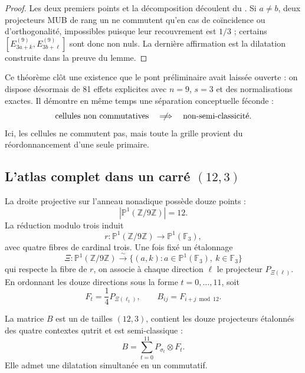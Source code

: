 \begin{proof}
Les deux premiers points et la décomposition découlent du
. Si $a\ne b$, deux projecteurs MUB de rang un ne
commutent qu'en cas de coïncidence ou d'orthogonalité, impossibles puisque leur recouvrement
est $1/3$ ; certains
$[E_{3a+k}^{(9)},E_{3b+\ell}^{(9)}]$ sont donc non nuls. La dernière affirmation est la
dilatation construite dans la preuve du lemme.
\end{proof}

\begin{bridgebox}
Ce théorème clôt une existence que le pont préliminaire avait laissée
ouverte : on dispose désormais de 81 effets explicites avec $n=9$, $s=3$ et des normalisations
exactes. Il démontre en même temps une séparation conceptuelle féconde :
\[
 \text{cellules non commutatives}
 \quad\centernot\Longrightarrow\quad
 \text{non-semi-classicité}.
\]
Ici, les cellules ne commutent pas, mais toute la grille provient du réordonnancement d'une
seule \POVM primaire.
\end{bridgebox}

\subsection{L'atlas complet dans un carré \texorpdfstring{$(12,3)$}{(12,3)}}

La droite projective sur l'anneau nonadique possède douze points :
\[
 |\mathbb P^1(\mathbb Z/9\mathbb Z)|=12.
 \tag{GMC-4.9}
\]
La réduction modulo trois induit
\[
 r:\mathbb P^1(\mathbb Z/9\mathbb Z)
 \longrightarrow\mathbb P^1(\mathbb F_3),
 \tag{GMC-4.10}
\]
avec quatre fibres de cardinal trois. Une fois fixé un étalonnage
\[
 \Xi:\mathbb P^1(\mathbb Z/9\mathbb Z)
 \xrightarrow{\sim}
 \{(a,k):a\in\mathbb P^1(\mathbb F_3),\ k\in\mathbb F_3\}
 \tag{GMC-4.11}
\]
qui respecte la fibre de $r$, on associe à chaque direction $\ell$ le projecteur
$P_{\Xi(\ell)}$. En ordonnant les douze directions sous la forme $t=0,\ldots,11$, soit
\[
 F_t=\frac14P_{\Xi(\ell_t)},
 \qquad
 B_{ij}=F_{i+j\bmod12}.
 \tag{GMC-4.12}
\]

\begin{theorem}
\label{p12-83-c22-s3:gmc:thm:qms-12-3}
La matrice $B$ est un \QMS de tailles $(12,3)$, contient les douze projecteurs
étalonnés des quatre contextes qutrit et est semi-classique :
\[
 B=\sum_{t=0}^{11}P_{\sigma_t}\otimes F_t.
 \tag{GMC-4.13}
\]
Elle admet une dilatation simultanée en un \QPM commutatif.
\end{theorem}


